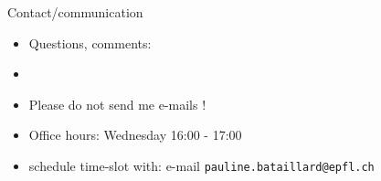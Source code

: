    \begin{frame}{Contact/communication}

     \begin{itemize}
     \item Questions, comments: 
     \item {} 
     \item Please do not send me e-mails !
     \item Office hours: Wednesday 16:00 - 17:00 
     \item  schedule time-slot with: e-mail  {\tt pauline.bataillard@epfl.ch  }
     \end{itemize}
     
   \end{frame}


   

